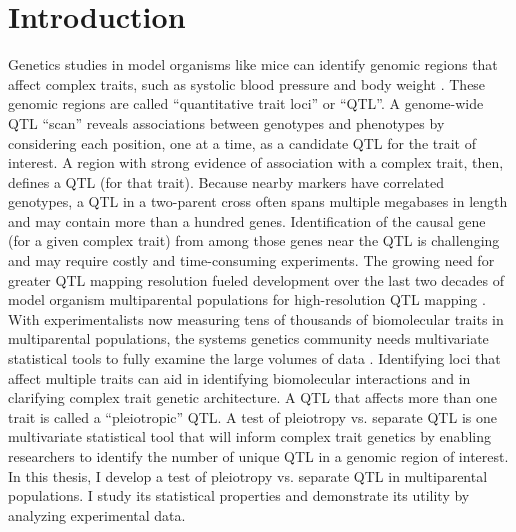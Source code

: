 \documentclass[oneside]{book}\usepackage[]{graphicx}\usepackage[]{color}
\begin{document}

%



\tableofcontents
\mainmatter %

\chapter{Introduction}

Genetics studies in model organisms like mice can identify 
genomic regions that affect complex traits, such as systolic blood pressure and body weight \citep{sax1923association,soller1976power,lander1989mapping,broman2009guide,jansen2007quantitative}. These genomic regions are called ``quantitative trait loci'' or ``QTL''. 
A genome-wide QTL ``scan'' reveals
associations between genotypes and phenotypes by considering each position,
one at a time, as a candidate QTL for the trait of interest.
A region with strong evidence of association with a complex trait, then, defines a QTL (for that trait). 
Because nearby markers have correlated
genotypes, a QTL in a two-parent cross often spans multiple megabases in length
and may contain more than a hundred genes.
Identification of the causal gene (for a given complex trait) from among those genes near the QTL is
challenging and may require costly and time-consuming experiments. 
The growing need for greater QTL mapping resolution fueled development over the
last two decades of model organism multiparental populations for high-resolution QTL mapping \citep{de2017back,churchill2004collaborative,svenson2012high,huang2012multiparent,shivakumar2018soybean,huang2011analysis,kover2009multiparent,tisne2017identification,stanley2017genetic}.
With experimentalists now measuring tens of thousands of biomolecular traits 
in multiparental populations, the systems genetics community needs multivariate
statistical tools to fully examine the large volumes of data \citep{keller2018genetic,chick2016defining}. 
Identifying loci that affect multiple traits can aid in identifying biomolecular interactions and in clarifying complex trait genetic architecture. A QTL that affects more than one trait is called a ``pleiotropic'' QTL. 
A test of pleiotropy vs. separate QTL is one multivariate statistical tool that will inform
complex trait genetics by enabling researchers to identify the number of
unique QTL in a genomic region of interest.
In this thesis, I develop a test of pleiotropy vs. separate QTL in multiparental
populations. I study its statistical properties and demonstrate its utility
by analyzing experimental data. 
\end{document}
